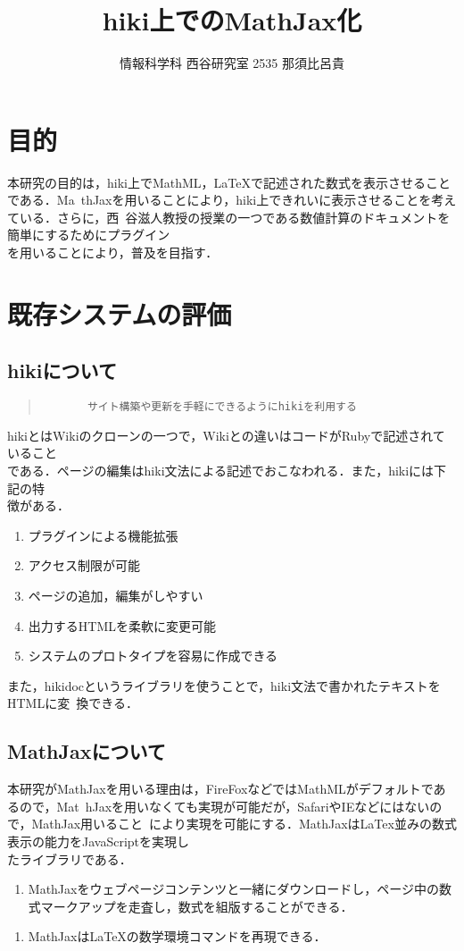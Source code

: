 \documentclass[a4j,twocolumn]{jsarticle}
\begin{document}
\title{hiki上でのMathJax化}
\author{情報科学科 西谷研究室 2535 那須比呂貴}
\date{}
\maketitle
\section{目的}
本研究の目的は，hiki上でMathML，LaTeXで記述された数式を表示させることである．Ma\
thJaxを用いることにより，hiki上できれいに表示させることを考えている．さらに，西\
谷滋人教授の授業の一つである数値計算のドキュメントを簡単にするためにプラグイン\\
を用いることにより，普及を目指す．

\section{既存システムの評価}
\subsection{hikiについて}\begin{quote}\begin{verbatim}
       サイト構築や更新を手軽にできるようにhikiを利用する
\end{verbatim}\end{quote}
hikiとはWikiのクローンの一つで，Wikiとの違いはコードがRubyで記述されていること\\
である．ページの編集はhiki文法による記述でおこなわれる．また，hikiには下記の特\\
徴がある．
\begin{enumerate}
\item プラグインによる機能拡張
\item アクセス制限が可能
\item ページの追加，編集がしやすい
\item 出力するHTMLを柔軟に変更可能
\item システムのプロトタイプを容易に作成できる
\end{enumerate}
また，hikidocというライブラリを使うことで，hiki文法で書かれたテキストをHTMLに変\
換できる．

\subsection{MathJaxについて}
本研究がMathJaxを用いる理由は，FireFoxなどではMathMLがデフォルトであるので，Mat\
hJaxを用いなくても実現が可能だが，SafariやIEなどにはないので，MathJax用いること\
により実現を可能にする．MathJaxはLaTex並みの数式表示の能力をJavaScriptを実現し\\
たライブラリである．
\begin{enumerate}
\item MathJaxをウェブページコンテンツと一緒にダウンロードし，ページ中の数式マークアップを走査し，数式を組版することができる．
\end{enumerate}\begin{enumerate}
\item MathJaxはLaTeXの数学環境コマンドを再現できる．
\end{enumerate}
\end{document}
